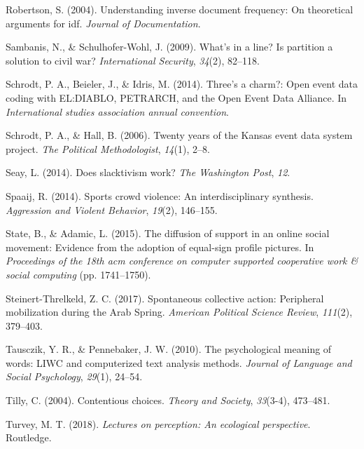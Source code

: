 \documentclass[english,man]{apa6}
\begin{document}
\leavevmode\hypertarget{ref-robertson2004understanding}{}%
Robertson, S. (2004). Understanding inverse document frequency: On theoretical arguments for idf. \emph{Journal of Documentation}.

\leavevmode\hypertarget{ref-sambanis2009s}{}%
Sambanis, N., \& Schulhofer-Wohl, J. (2009). What's in a line? Is partition a solution to civil war? \emph{International Security}, \emph{34}(2), 82--118.

\leavevmode\hypertarget{ref-schrodt2014three}{}%
Schrodt, P. A., Beieler, J., \& Idris, M. (2014). Three's a charm?: Open event data coding with EL:DIABLO, PETRARCH, and the Open Event Data Alliance. In \emph{International studies association annual convention}.

\leavevmode\hypertarget{ref-schrodt2006twenty}{}%
Schrodt, P. A., \& Hall, B. (2006). Twenty years of the Kansas event data system project. \emph{The Political Methodologist}, \emph{14}(1), 2--8.

\leavevmode\hypertarget{ref-seay2014slacktivism}{}%
Seay, L. (2014). Does slacktivism work? \emph{The Washington Post}, \emph{12}.

\leavevmode\hypertarget{ref-spaaij2014sports}{}%
Spaaij, R. (2014). Sports crowd violence: An interdisciplinary synthesis. \emph{Aggression and Violent Behavior}, \emph{19}(2), 146--155.

\leavevmode\hypertarget{ref-state2015diffusion}{}%
State, B., \& Adamic, L. (2015). The diffusion of support in an online social movement: Evidence from the adoption of equal-sign profile pictures. In \emph{Proceedings of the 18th acm conference on computer supported cooperative work \& social computing} (pp. 1741--1750).

\leavevmode\hypertarget{ref-steinert2017spontaneous}{}%
Steinert-Threlkeld, Z. C. (2017). Spontaneous collective action: Peripheral mobilization during the Arab Spring. \emph{American Political Science Review}, \emph{111}(2), 379--403.

\leavevmode\hypertarget{ref-tausczik2010psychological}{}%
Tausczik, Y. R., \& Pennebaker, J. W. (2010). The psychological meaning of words: LIWC and computerized text analysis methods. \emph{Journal of Language and Social Psychology}, \emph{29}(1), 24--54.

\leavevmode\hypertarget{ref-tilly2004contentious}{}%
Tilly, C. (2004). Contentious choices. \emph{Theory and Society}, \emph{33}(3-4), 473--481.

\leavevmode\hypertarget{ref-turvey2018lectures}{}%
Turvey, M. T. (2018). \emph{Lectures on perception: An ecological perspective}. Routledge.
\end{document}
